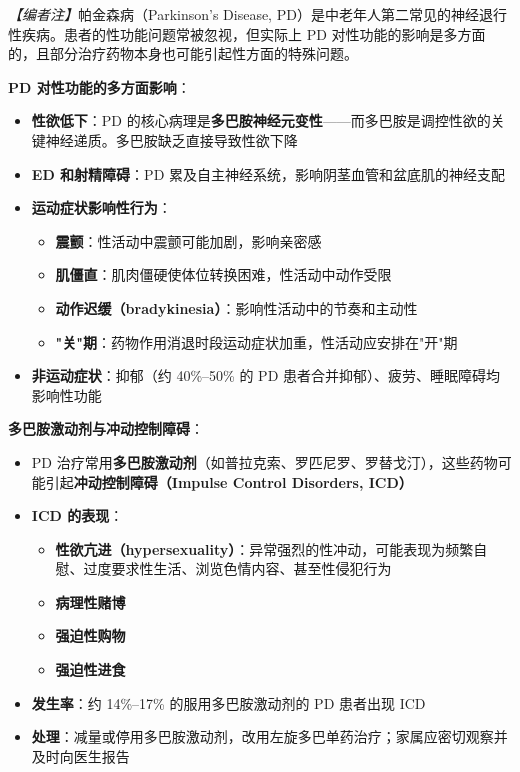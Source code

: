 \noindent\textit{【编者注】}帕金森病（Parkinson's Disease, PD）是中老年人第二常见的神经退行性疾病。患者的性功能问题常被忽视，但实际上 PD 对性功能的影响是多方面的，且部分治疗药物本身也可能引起性方面的特殊问题。

\vspace{0.5em}
\noindent\textbf{PD 对性功能的多方面影响}：

\begin{itemize}[leftmargin=2cm]
	\item \textbf{性欲低下}：PD 的核心病理是\textbf{多巴胺神经元变性}——而多巴胺是调控性欲的关键神经递质。多巴胺缺乏直接导致性欲下降
	\item \textbf{ED 和射精障碍}：PD 累及自主神经系统，影响阴茎血管和盆底肌的神经支配
	\item \textbf{运动症状影响性行为}：
	\begin{itemize}
		\item \textbf{震颤}：性活动中震颤可能加剧，影响亲密感
		\item \textbf{肌僵直}：肌肉僵硬使体位转换困难，性活动中动作受限
		\item \textbf{动作迟缓（bradykinesia）}：影响性活动中的节奏和主动性
		\item \textbf{"关"期}：药物作用消退时段运动症状加重，性活动应安排在"开"期
	\end{itemize}
	\item \textbf{非运动症状}：抑郁（约 40\%--50\% 的 PD 患者合并抑郁）、疲劳、睡眠障碍均影响性功能
\end{itemize}

\vspace{0.5em}
\noindent\textbf{多巴胺激动剂与冲动控制障碍}：

\begin{itemize}[leftmargin=2cm]
	\item PD 治疗常用\textbf{多巴胺激动剂}（如普拉克索、罗匹尼罗、罗替戈汀），这些药物可能引起\textbf{冲动控制障碍（Impulse Control Disorders, ICD）}
	\item \textbf{ICD 的表现}：
	\begin{itemize}
		\item \textbf{性欲亢进（hypersexuality）}：异常强烈的性冲动，可能表现为频繁自慰、过度要求性生活、浏览色情内容、甚至性侵犯行为
		\item \textbf{病理性赌博}
		\item \textbf{强迫性购物}
		\item \textbf{强迫性进食}
	\end{itemize}
	\item \textbf{发生率}：约 14\%--17\% 的服用多巴胺激动剂的 PD 患者出现 ICD
	\item \textbf{处理}：减量或停用多巴胺激动剂，改用左旋多巴单药治疗；家属应密切观察并及时向医生报告
\end{itemize}

